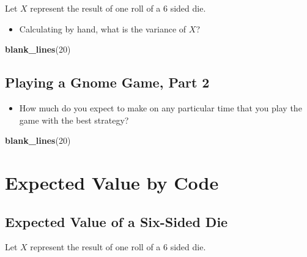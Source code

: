 \documentclass[
]{book}
\newenvironment{Shaded}{\begin{snugshade}}{\end{snugshade}}
\newcommand{\DecValTok}[1]{\textcolor[rgb]{0.00,0.00,0.81}{#1}}
\newcommand{\FunctionTok}[1]{\textcolor[rgb]{0.13,0.29,0.53}{\textbf{#1}}}
\newcommand{\NormalTok}[1]{#1}
\providecommand{\tightlist}{%
  \setlength{\itemsep}{0pt}\setlength{\parskip}{0pt}}
\theoremstyle{definition}
\theoremstyle{definition}
\theoremstyle{definition}
\theoremstyle{definition}
\theoremstyle{remark}
\begin{document}
Let \(X\) represent the result of one roll of a 6 sided die.

\begin{itemize}
\tightlist
\item
  Calculating by hand, what is the variance of \(X\)?
\end{itemize}

\begin{Shaded}
\begin{Highlighting}[]
\FunctionTok{blank\_lines}\NormalTok{(}\DecValTok{20}\NormalTok{)}
\end{Highlighting}
\end{Shaded}

\vspace{20cm}

\hypertarget{playing-a-gnome-game-part-2}{%
\subsection{Playing a Gnome Game, Part 2}\label{playing-a-gnome-game-part-2}}

\begin{itemize}
\tightlist
\item
  How much do you expect to make on any particular time that you play the game with the best strategy?
\end{itemize}

\begin{Shaded}
\begin{Highlighting}[]
\FunctionTok{blank\_lines}\NormalTok{(}\DecValTok{20}\NormalTok{)}
\end{Highlighting}
\end{Shaded}

\vspace{20cm}

\hypertarget{expected-value-by-code}{%
\section{Expected Value by Code}\label{expected-value-by-code}}

\hypertarget{expected-value-of-a-six-sided-die}{%
\subsection{Expected Value of a Six-Sided Die}\label{expected-value-of-a-six-sided-die}}

Let \(X\) represent the result of one roll of a 6 sided die.
\end{document}

